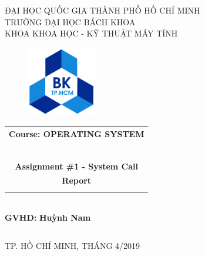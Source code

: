 \documentclass[a4paper]{article}
\begin{document}
\begin{titlepage}
\begin{center}
\large ĐẠI HỌC QUỐC GIA THÀNH PHỐ HỒ CHÍ MINH \\
TRƯỜNG ĐẠI HỌC BÁCH KHOA \\
KHOA KHOA HỌC - KỸ THUẬT MÁY TÍNH 
\end{center}

\vspace{1cm}

\begin{figure}[h!]
\begin{center}
\includegraphics[width=3cm]{hcmut.png}
\end{center}
\end{figure}

\vspace{1cm}

\begin{center}
\begin{tabular}{c}
\Large  \textbf{{\Large Course: OPERATING SYSTEM}}\\
~~\\
\hline
\hline
\\
\vspace{0.5cm}
\Large \textbf{{\Huge Assignment \#1 - System Call  }}\\
\Large \textbf{{\Huge Report  }}\\
\\
\hline
\hline
\end{tabular}\\
\vspace{0.5cm}
\Large  \textbf{GVHD:} \Large \textbf{Huỳnh Nam}\\
\end{center}

\vspace{2.8cm}


\begin{table}[h]

\begin{tabular}{rrl}


\end{tabular}
\end{table}

\vspace{2.5cm}

\begin{center}
{\large TP. HỒ CHÍ MINH, THÁNG 4/2019}
\end{center}
\end{titlepage}
\end{document}
